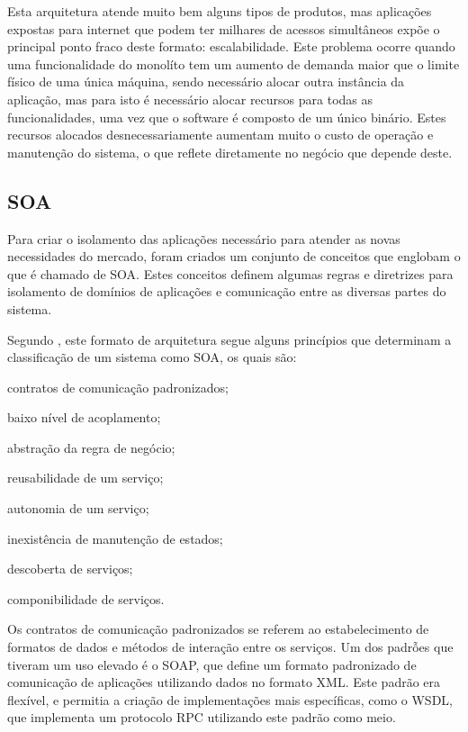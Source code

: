 Esta arquitetura atende muito bem alguns tipos de produtos, mas aplicações
expostas para internet que podem ter milhares de acessos simultâneos expõe o
principal ponto fraco deste formato: escalabilidade. Este problema ocorre
quando uma funcionalidade do monolíto tem um aumento de demanda maior que o
limite físico de uma única máquina, sendo necessário alocar outra instância
da aplicação, mas para isto é necessário alocar recursos para todas as
funcionalidades, uma vez que o software é composto de um único binário. Estes
recursos alocados desnecessariamente aumentam muito o custo de operação e
manutenção do sistema, o que reflete diretamente no negócio que depende deste.

\subsection{SOA}

Para criar o isolamento das aplicações necessário para atender as novas
necessidades do mercado, foram criados um conjunto de conceitos que englobam o
que é chamado de \ac{SOA}. Estes conceitos definem algumas regras e diretrizes
para isolamento de domínios de aplicações e comunicação entre as diversas partes
do sistema.

Segundo , este formato de arquitetura segue alguns
princípios que determinam a classificação de um sistema como \ac{SOA},
os quais são:

\begin{alineas}
  \item contratos de comunicação padronizados;
  \item baixo nível de acoplamento;
  \item abstração da regra de negócio;
  \item reusabilidade de um serviço;
  \item autonomia de um serviço;
  \item inexistência de manutenção de estados;
  \item descoberta de serviços;
  \item componibilidade de serviços.
\end{alineas}

Os contratos de comunicação padronizados se referem ao estabelecimento de
formatos de dados e métodos de interação entre os serviços. Um dos padrỗes
que tiveram um uso elevado é o \ac{SOAP}, que define um formato padronizado
de comunicação de aplicações utilizando dados no formato \ac{XML}. Este padrão
era flexível, e permitia a criação de implementações mais específicas, como o
\ac{WSDL}, que implementa um protocolo \ac{RPC} utilizando este padrão como
meio.

